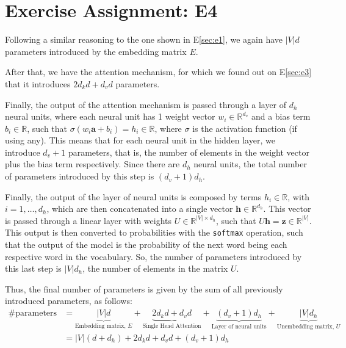 \documentclass{article}
\begin{document}
\section{Exercise Assignment: E4}\label{sec:e4}
Following a similar reasoning to the one shown in E\ref{sec:e1}, we again have $|V|d$ parameters introduced by the embedding matrix $E$.

After that, we have the attention mechanism, for which we found out on E\ref{sec:e3} that it introduces $2d_kd + d_vd$ parameters.

Finally, the output of the attention mechanism is passed through a layer of $d_h$ neural units, where each neural unit has 1 weight vector $w_i \in \mathbb{R}^{d_v}$ and a bias term $b_i \in \mathbb{R}$, such that $\sigma(w_i \mathbf{a} + b_i) = h_i \in \mathbb{R}$, where $\sigma$ is the activation function (if using any). This means that for each neural unit in the hidden layer, we introduce $d_v + 1$ parameters, that is, the number of elements in the weight vector plus the bias term respectively. Since there are $d_h$ neural units, the total number of parameters introduced by this step is $\left(d_v + 1\right)d_h$.

Finally, the output of the layer of neural units is composed by terms $h_i \in \mathbb{R}$, with $i = 1,\dots,d_h$, which are then concatenated into a single vector $\mathbf{h} \in \mathbb{R}^{d_h}$. This vector is passed through a linear layer with weights $U \in \mathbb{R}^{|V| \times d_h}$, such that $U \mathbf{h} = \mathbf{z} \in \mathbb{R}^{|V|}$. This output is then converted to probabilities with the \texttt{softmax} operation, such that the output of the model is the probability of the next word being each respective word in the vocabulary. So, the number of parameters introduced by this last step is $|V|d_h$, the number of elements in the matrix $U$.

Thus, the final number of parameters is given by the sum of all previously introduced parameters, as follows:
\begin{align*}
    \text{\# parameters} & = \underbrace{\left|V\right|d}_{\text{Embedding matrix, }E} + \underbrace{2d_kd + d_vd}_{\text{Single Head Attention}} + \underbrace{(d_v + 1)d_h}_{\text{Layer of neural units}} + \underbrace{|V|d_h}_{\text{Unembedding matrix, }U}  \\
                         & = \left|V\right|(d + d_h) + 2d_kd + d_vd + (d_v + 1)d_h
\end{align*}

\end{document}
